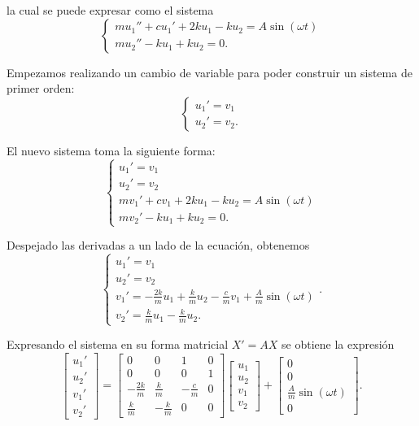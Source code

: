 la cual se puede expresar como el sistema
\[
	\begin{cases}
    	mu_1'' + cu_1' + 2ku_1 - ku_2 = A\sin(\omega t) \\
    	mu_2'' - ku_1 + ku_2 = 0
	.\end{cases}
\]

Empezamos realizando un cambio de variable para poder construir un sistema de primer orden:
\[
	\begin{cases}
    	u_1'=v_1 \\
    	u_2'=v_2.
	\end{cases}
\]

El nuevo sistema toma la siguiente forma:
\[
	\begin{cases}
    	u_1'=v_1 \\
    	u_2'=v_2 \\
    	mv_1' + cv_1 + 2ku_1 - ku_2 = A\sin(\omega t) \\ mv_2' - ku_1 + ku_2 = 0. \end{cases}
\]

Despejado las derivadas a un lado de la ecuación, obtenemos
\[
	\begin{cases}
    	u_1' = v_1 \\
    	u_2' = v_2 \\
    	v_1' = - \frac{2k}{m}u_1 + \frac{k}{m}u_2 - \frac{c}{m}v_1 + \frac{A}{m}\sin(\omega t) \\
    	v_2' = \frac{k}{m}u_1 - \frac{k}{m}u_2.
	\end{cases}
.\]

Expresando el sistema en su forma matricial \(X' = AX\) se obtiene la expresión
\[
    \begin{bmatrix} u_1' \\ u_2' \\ v_1' \\ v_2' \end{bmatrix} =
    \begin{bmatrix}
        0 & 0 & 1 & 0 \\
   	0 & 0 & 0 & 1 \\
    -\frac{2k}{m} & \frac{k}{m} & -\frac{c}{m} & 0 \\
    \frac{k}{m} & -\frac{k}{m} & 0 & 0
    \end{bmatrix} \begin{bmatrix} u_1 \\ u_2 \\ v_1 \\ v_2 \end{bmatrix}
    + \begin{bmatrix} 0 \\ 0 \\ \frac{A}{m}\sin(\omega t) \\ 0 \end{bmatrix}
.\]

